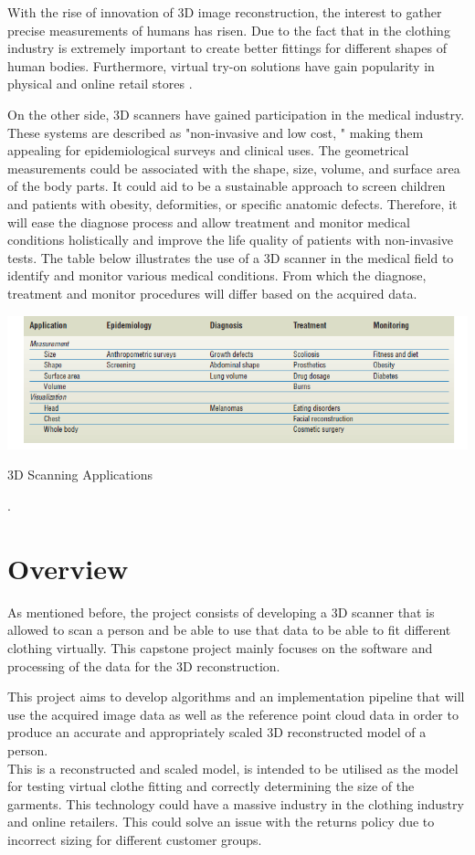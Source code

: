 \documentclass[12pt]{report}
\begin{document}
With the rise of innovation of 3D image reconstruction, the interest to gather precise measurements of humans has risen. Due to the fact that in the clothing industry
is extremely important to create better fittings for different shapes of human bodies. 
Furthermore, virtual try-on solutions have gain popularity in physical and online retail stores .

On the other side, 3D scanners have gained participation in the medical industry. These systems are described as "non-invasive and low cost, " making them appealing for epidemiological surveys and clinical uses. 
The geometrical measurements could be associated with the shape, size, volume, and surface area of the body parts. It could aid to be a sustainable approach to screen children and patients with obesity, deformities, or specific anatomic defects. 
Therefore, it will ease the diagnose process and allow treatment and monitor medical conditions holistically and improve the life quality of patients with non-invasive tests.
The table below illustrates the use of a 3D scanner in the medical field to identify and monitor various medical conditions. 
From which the diagnose, treatment and monitor procedures will differ based on the acquired data.

\begin{table}[ht]
    \centering
    \includegraphics[width=15cm]{table1.png}
    \caption{3D Scanning Applications}\cite[]{treleaven_wells_2007}.
\end{table}

\section{Overview}
As mentioned before, the project consists of developing a 3D scanner that is allowed to scan a person and be able to use that data to be able to fit different clothing virtually.
This capstone project mainly focuses on the software and processing of the data for the 3D reconstruction.

This project aims to develop algorithms and an implementation pipeline that will use the acquired image data as well as the reference point cloud data in order to produce an accurate
and appropriately scaled 3D reconstructed model of a person.\\
This is a reconstructed and scaled model, is intended to be utilised as the model for testing virtual clothe fitting and correctly determining the size of the garments. 
This technology could have a massive industry in the clothing industry and online retailers. This could solve an issue with the returns policy due to incorrect sizing for different customer groups.
\end{document}
